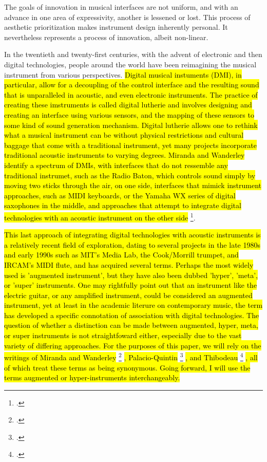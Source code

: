 \documentclass[12pt,twoside,maitrise]{dms_ks}
\theoremstyle{definition}
\begin{document}

The goals of innovation in musical interfaces are not uniform, and with an advance in one area of expressivity, another is lessened or lost. 
This process of aesthetic prioritization makes instrument design inherently personal. It nevertheless represents a process of innovation, albeit non-linear. 

In the twentieth and twenty-first centuries, with the advent of electronic and then digital technologies, people around the world have been reimagining the musical instrument from various perspectives. 
\hl{Digital musical instuments (DMI), in particular, allow for a decoupling of the control interface and the resulting sound that is unparalleled in acoustic, and even electronic instruments.
The practice of creating these imstruments is called digital lutherie and involves designing and creating an interface using various sensors, and the mapping of these sensors to some kind of sound generation mechanism.
Digital lutherie allows one to rethink what a musical instrument can be without physical restrictions and cultural baggage that come with a traditional instrument, yet many projects incorporate traditional acoustic instruments to varying degrees. 
Miranda and Wanderley identify a spectrum of DMIs, with interfaces that do not ressemble any traditional instrumet, such as the Radio Baton, which controls sound simply by moving two sticks through the air, on one side, interfaces that mimick instrument approaches, such as MIDI keyboards, or the Yamaha WX series of digital saxophones in the middle, and approaches that attempt to integrate digital technologies with an acoustic instrument on the other side} \footcite[19-20]{miranda_new_2006}.


\hl{This last approach of integrating digital technologies with acoustic instruments is a relatively recent field of exploration, dating to several projects in the late 1980s and early 1990s such as MIT's Media Lab, the Cook/Morrill trumpet, and IRCAM's MIDI flute, and has acquired several terms.
Perhaps the most widely used is 'augmented instrument', but they have also been dubbed 'hyper', 'meta', or 'super' instruments.
One may rightfully point out that an instrument like the electric guitar, or any amplified instrument, could be considered an augmented instrument, yet at least in the academic literure on contemporary music, the term has developed a specific connotation of association with digital technologies. 
The question of whether a distinction can be made between augmented, hyper, meta, or super instruments is not straightfoward either, especially due to the vast variety of differing approaches.
For the purposes of this paper, we will rely on the writings of Miranda and Wanderley} \footcite[21]{miranda_new_2006} \hl{, Palacio-Quintin} \footcite[25]{palacio-quintin_composition_2012-1} \hl{, and Thibodeau } \footcite[1]{thibodeau_trumpet_2011} \hl{, all of which treat these terms as being synonymous.
Going forward, I will use the terms augmented or hyper-instruments interchangeably.}
\end{document}
